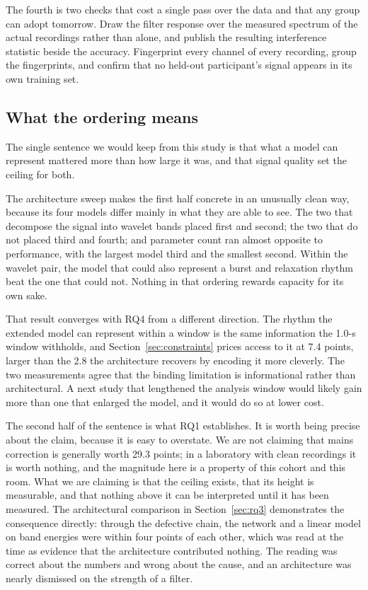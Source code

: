 \documentclass[pdflatex,sn-nature,iicol]{sn-jnl}
\begin{document}
The fourth is two checks that cost a single pass over the data and that any group can adopt tomorrow. Draw the filter response over the measured spectrum of the actual recordings rather than alone, and publish the resulting interference statistic beside the accuracy. Fingerprint every channel of every recording, group the fingerprints, and confirm that no held-out participant's signal appears in its own training set.

\subsection{What the ordering means}

The single sentence we would keep from this study is that what a model can represent mattered more than how large it was, and that signal quality set the ceiling for both.

The architecture sweep makes the first half concrete in an unusually clean way, because its four models differ mainly in what they are able to see. The two that decompose the signal into wavelet bands placed first and second; the two that do not placed third and fourth; and parameter count ran almost opposite to performance, with the largest model third and the smallest second. Within the wavelet pair, the model that could also represent a burst and relaxation rhythm beat the one that could not. Nothing in that ordering rewards capacity for its own sake.

That result converges with RQ4 from a different direction. The rhythm the extended model can represent within a window is the same information the 1.0-s window withholds, and Section~\ref{sec:constraints} prices access to it at 7.4 points, larger than the 2.8 the architecture recovers by encoding it more cleverly. The two measurements agree that the binding limitation is informational rather than architectural. A next study that lengthened the analysis window would likely gain more than one that enlarged the model, and it would do so at lower cost.

The second half of the sentence is what RQ1 establishes. It is worth being precise about the claim, because it is easy to overstate. We are not claiming that mains correction is generally worth 29.3 points; in a laboratory with clean recordings it is worth nothing, and the magnitude here is a property of this cohort and this room. What we are claiming is that the ceiling exists, that its height is measurable, and that nothing above it can be interpreted until it has been measured. The architectural comparison in Section~\ref{sec:rq3} demonstrates the consequence directly: through the defective chain, the network and a linear model on band energies were within four points of each other, which was read at the time as evidence that the architecture contributed nothing. The reading was correct about the numbers and wrong about the cause, and an architecture was nearly dismissed on the strength of a filter.
\end{document}

